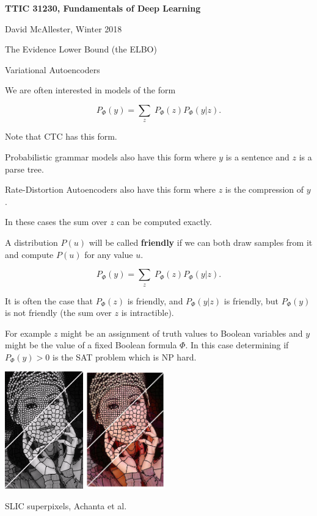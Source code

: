 





{\Huge

  \centerline{\bf TTIC 31230, Fundamentals of Deep Learning}
  \bigskip
  \centerline{David McAllester, Winter 2018}
  \vfill
  \centerline{The Evidence Lower Bound (the ELBO)}
  \vfill
  \centerline{Variational Autoencoders}
  \vfill
  \vfill


We are often interested in models of the form

\vfill
$$P_\Phi(y) = \sum_z\;P_\Phi(z)P_\Phi(y|z).$$

\vfill
Note that CTC has this form.

\vfill
Probabilistic grammar models also have this form where $y$ is a sentence and $z$ is a parse tree.

\vfill
Rate-Distortion Autoencoders also have this form where $z$ is the compression of $y$.

\vfill
In these cases the sum over $z$ can be computed exactly.


A distribution $P(u)$ will be called {\bf friendly} if we can both draw samples from it and compute $P(u)$ for any value $u$.

\vfill
$$P_\Phi(y) = \sum_z\;P_\Phi(z)P_\Phi(y|z).$$

\vfill
It is often the case that $P_\Phi(z)$ is friendly, and $P_\Phi(y|z)$ is friendly, but $P_\Phi(y)$ is not friendly (the sum over $z$ is intractible).

\vfill
For example $z$ might be an assignment of truth values to Boolean variables and $y$ might be the value of a fixed Boolean formula $\Phi$.  In this case
determining if $P_\Phi(y) > 0$ is the SAT problem which is NP hard.


\centerline{\includegraphics[height = 2in]{../images/SLIC} \hspace{.5in} \includegraphics[height = 2in]{../images/SLICcolor}}
\centerline{\huge SLIC superpixels, Achanta et al.}

}
